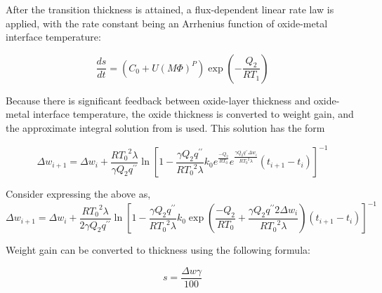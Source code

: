 After the transition thickness is attained, a flux-dependent linear rate law is applied, with the
rate constant being an Arrhenius function of oxide-metal interface temperature:

\begin{equation}
    \label{eq:flux_dependent_linear_rate_law}
    \frac{ds}{dt} = \left( C_{0} + U\left( M\Phi \right)^{P} \right)\exp\left( - \frac{Q_{2}}{RT_{1}} \right)
\end{equation}

Because there is significant feedback between oxide-layer thickness and oxide-metal interface
temperature, the oxide thickness is converted to weight gain, and the approximate integral solution
from \cite{ref:Garzarolli1982} is used. This solution has the form

\begin{equation}
    \label{eq:integral_solution_weight_gain}
    \Delta w_{i + 1} = \Delta w_{i} + \frac{R{T_{0}}^{2}\lambda}{\gamma Q_{2}q^{\prime \prime}}{\ln\left\lbrack 1 - \frac{\gamma Q_{2}q^{\prime \prime }}{R{T_{0}}^{2}\lambda}k_{0}e^{\frac{- Q_{2}}{RT_{0}}}e^{\frac{\gamma Q_{2}q^{\prime \prime }\Delta w_{i}}{R{T_{0}}^{2}\lambda}}\left( t_{i + 1} - t_{i} \right) \right\rbrack}^{- 1}
\end{equation}

{\color{red}Consider expressing the above as,}
\begin{equation}
    \label{eq:weight_gain_above_transition_thickness_ZIRLO_OptZIRLO}
    \Delta w_{i + 1} = \Delta w_{i} + \frac{R{T_{0}}^{2}\lambda}{2\gamma Q_{2}q^{\prime \prime}}{\ln\left\lbrack 1 - \frac{\gamma Q_{2}q^{\prime \prime}}{R{T_{0}}^{2}\lambda}k_{0}\exp\left( \frac{- Q_{2}}{RT_{0}}+\frac{\gamma Q_{2}q^{\prime \prime}2\Delta w_{i}}{R{T_{0}}^{2}\lambda}\right)\left( t_{i + 1} - t_{i} \right) \right\rbrack}^{- 1}
\end{equation}

Weight gain can be converted to thickness using the following formula:

\begin{equation}
    \label{eq:weight_gain_oxide_thickness}
    s = \frac{\Delta w\gamma}{100}
\end{equation}


